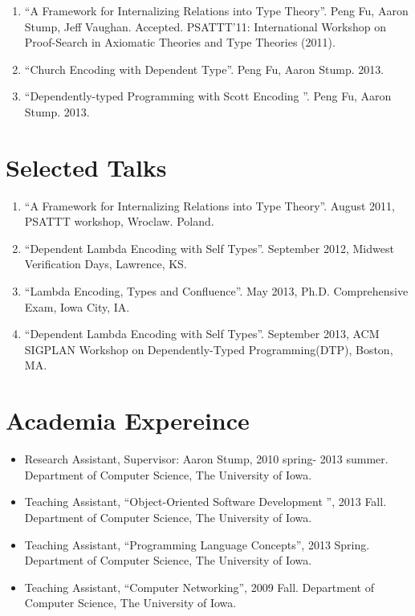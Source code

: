\documentclass[10pt]{article}
\begin{document}
\begin{enumerate}
\item ``A Framework for Internalizing Relations into Type Theory''. Peng Fu, Aaron Stump, Jeff Vaughan. Accepted. PSATTT'11: International Workshop on Proof-Search in Axiomatic Theories and Type Theories (2011). 
\item ``Church Encoding with Dependent Type''. Peng Fu, Aaron Stump. 2013.
\item ``Dependently-typed Programming with Scott Encoding ''. Peng Fu, Aaron Stump. 2013.
  
\end{enumerate}

\section*{Selected Talks}

\begin{enumerate}

\item ``A Framework for Internalizing Relations into Type Theory''. August 2011, PSATTT workshop, Wroclaw. Poland. 
\item ``Dependent Lambda Encoding with Self Types''. September 2012, Midwest Verification Days, Lawrence, KS.
\item ``Lambda Encoding, Types and Confluence''. May 2013, Ph.D. Comprehensive Exam, Iowa City, IA.
\item ``Dependent Lambda Encoding with Self Types''. September 2013, ACM SIGPLAN Workshop on Dependently-Typed Programming(DTP), Boston, MA.
\end{enumerate}

\section*{Academia Expereince}

\begin{itemize}
\item Research Assistant, Supervisor: Aaron Stump, 2010 spring- 2013 summer. Department of Computer Science, The University of Iowa.
\item Teaching Assistant,  ``Object-Oriented Software Development '', 2013 Fall. Department of Computer Science, The University of Iowa.
\item Teaching Assistant,  ``Programming Language Concepts'', 2013 Spring. Department of Computer Science, The University of Iowa.
  \item Teaching Assistant, ``Computer Networking'', 2009 Fall. Department of Computer Science, The University of Iowa.
\end{itemize}
\end{document}

